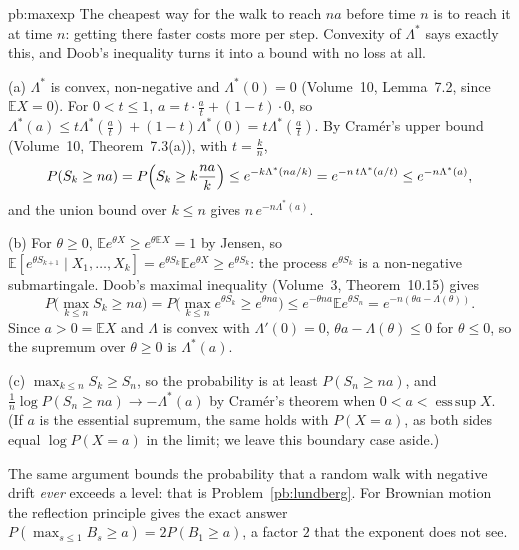 \begin{solution}{pb:maxexp}
\idea The cheapest way for the walk to reach $na$ before time $n$ is to reach it at time $n$: getting there faster costs more per step. Convexity of $\Lambda^*$ says
exactly this, and Doob's inequality turns it into a bound with no loss at all.

\writeup (a) $\Lambda^*$ is convex, non-negative and $\Lambda^*(0)=0$ (Volume~10, Lemma~7.2, since $\mathbb EX=0$). For $0<t\le1$, $a=t\cdot\frac at+(1-t)\cdot0$, so
$\Lambda^*(a)\le t\Lambda^*(\frac at)+(1-t)\Lambda^*(0)=t\Lambda^*(\frac at)$. By Cram\'er's upper bound (Volume~10, Theorem~7.3(a)), with $t=\frac kn$,
\[
P(S_k\ge na)=P\Bigl(S_k\ge k\frac{na}k\Bigr)\le e^{-k\Lambda^*(na/k)}=e^{-n\,t\Lambda^*(a/t)}\le e^{-n\Lambda^*(a)},
\]
and the union bound over $k\le n$ gives $n\,e^{-n\Lambda^*(a)}$.

(b) For $\theta\ge0$, $\mathbb Ee^{\theta X}\ge e^{\theta\mathbb EX}=1$ by Jensen, so $\mathbb E[e^{\theta S_{k+1}}\mid X_1,\dots,X_k]=e^{\theta S_k}\mathbb Ee^{\theta X}\ge e^{\theta S_k}$: the
process $e^{\theta S_k}$ is a non-negative submartingale. Doob's maximal inequality (Volume~3, Theorem~10.15) gives
\[
P\bigl(\max_{k\le n}S_k\ge na\bigr)=P\bigl(\max_{k\le n}e^{\theta S_k}\ge e^{\theta na}\bigr)\le e^{-\theta na}\mathbb Ee^{\theta S_n}=e^{-n(\theta a-\Lambda(\theta))}.
\]
Since $a>0=\mathbb EX$ and $\Lambda$ is convex with $\Lambda'(0)=0$, $\theta a-\Lambda(\theta)\le0$ for $\theta\le0$, so the supremum over $\theta\ge0$ is $\Lambda^*(a)$.

(c) $\max_{k\le n}S_k\ge S_n$, so the probability is at least $P(S_n\ge na)$, and $\frac1n\log P(S_n\ge na)\to-\Lambda^*(a)$ by Cram\'er's theorem when $0<a<\operatorname{ess\,sup}X$.
(If $a$ is the essential supremum, the same holds with $P(X=a)$, as both sides equal $\log P(X=a)$ in the limit; we leave this boundary case aside.)

\leads The same argument bounds the probability that a random walk with negative drift \emph{ever} exceeds a level: that is Problem~\ref{pb:lundberg}. For Brownian motion the
reflection principle gives the exact answer $P(\max_{s\le1}B_s\ge a)=2P(B_1\ge a)$, a factor $2$ that the exponent does not see.
\end{solution}

